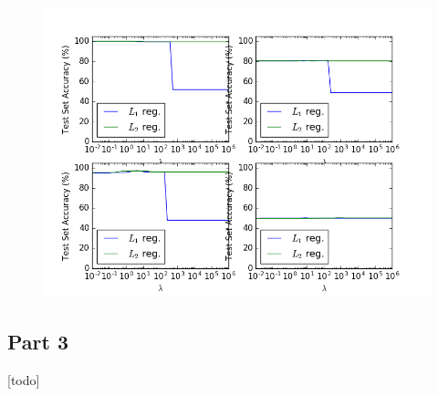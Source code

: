 \begin{figure}
	\centering
	\includegraphics [trim=0 0 0 0, clip, angle=0, width=0.8\columnwidth,
	keepaspectratio]{figures/1_2_accuracy}
	\caption{} 
	\label{fig:1_2_accuracy} 
\end{figure}

\subsection{Part 3}
[todo]

